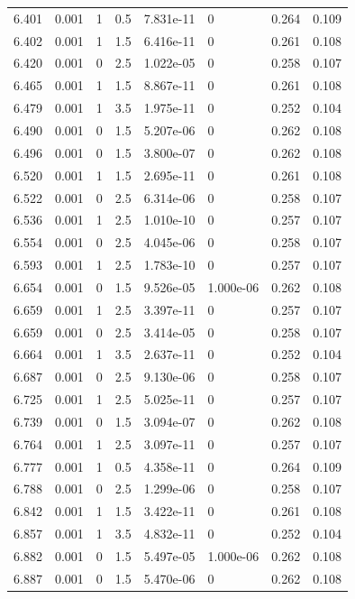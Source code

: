 \documentclass[preview]{standalone}
\begin{document}
{{{{{\begin{tabular}{L{1.2cm}C{1.2cm} C{0.3cm}C{0.5cm} C{1.4cm}C{1.4cm} C{1.4cm}C{1.4cm}}
  6.401  &  0.001  & 1     & 0.5 &  7.831e-11  & 0  & 0.264 &  0.109   \\ 
  6.402  &  0.001  & 1     & 1.5 &  6.416e-11  & 0  & 0.261 &  0.108   \\ 
  6.420  &  0.001  & 0     & 2.5 &  1.022e-05  & 0  & 0.258 &  0.107   \\ 
  6.465  &  0.001  & 1     & 1.5 &  8.867e-11  & 0  & 0.261 &  0.108   \\ 
  6.479  &  0.001  & 1     & 3.5 &  1.975e-11  & 0  & 0.252 &  0.104   \\ 
  6.490  &  0.001  & 0     & 1.5 &  5.207e-06  & 0  & 0.262 &  0.108   \\ 
  6.496  &  0.001  & 0     & 1.5 &  3.800e-07  & 0  & 0.262 &  0.108   \\ 
  6.520  &  0.001  & 1     & 1.5 &  2.695e-11  & 0  & 0.261 &  0.108   \\ 
  6.522  &  0.001  & 0     & 2.5 &  6.314e-06  & 0  & 0.258 &  0.107   \\ 
  6.536  &  0.001  & 1     & 2.5 &  1.010e-10  & 0  & 0.257 &  0.107   \\ 
  6.554  &  0.001  & 0     & 2.5 &  4.045e-06  & 0  & 0.258 &  0.107   \\ 
  6.593  &  0.001  & 1     & 2.5 &  1.783e-10  & 0  & 0.257 &  0.107   \\ 
  6.654  &  0.001  & 0     & 1.5 &  9.526e-05  & 1.000e-06  & 0.262 &  0.108   \\ 
  6.659  &  0.001  & 1     & 2.5 &  3.397e-11  & 0  & 0.257 &  0.107   \\ 
  6.659  &  0.001  & 0     & 2.5 &  3.414e-05  & 0  & 0.258 &  0.107   \\ 
  6.664  &  0.001  & 1     & 3.5 &  2.637e-11  & 0  & 0.252 &  0.104   \\ 
  6.687  &  0.001  & 0     & 2.5 &  9.130e-06  & 0  & 0.258 &  0.107   \\ 
  6.725  &  0.001  & 1     & 2.5 &  5.025e-11  & 0  & 0.257 &  0.107   \\ 
  6.739  &  0.001  & 0     & 1.5 &  3.094e-07  & 0  & 0.262 &  0.108   \\ 
  6.764  &  0.001  & 1     & 2.5 &  3.097e-11  & 0  & 0.257 &  0.107   \\ 
  6.777  &  0.001  & 1     & 0.5 &  4.358e-11  & 0  & 0.264 &  0.109   \\ 
  6.788  &  0.001  & 0     & 2.5 &  1.299e-06  & 0  & 0.258 &  0.107   \\ 
  6.842  &  0.001  & 1     & 1.5 &  3.422e-11  & 0  & 0.261 &  0.108   \\ 
  6.857  &  0.001  & 1     & 3.5 &  4.832e-11  & 0  & 0.252 &  0.104   \\ 
  6.882  &  0.001  & 0     & 1.5 &  5.497e-05  & 1.000e-06  & 0.262 &  0.108   \\ 
  6.887  &  0.001  & 0     & 1.5 &  5.470e-06  & 0  & 0.262 &  0.108   \\ 
\hline 
\end{tabular} 

}}}}}
\end{document}
